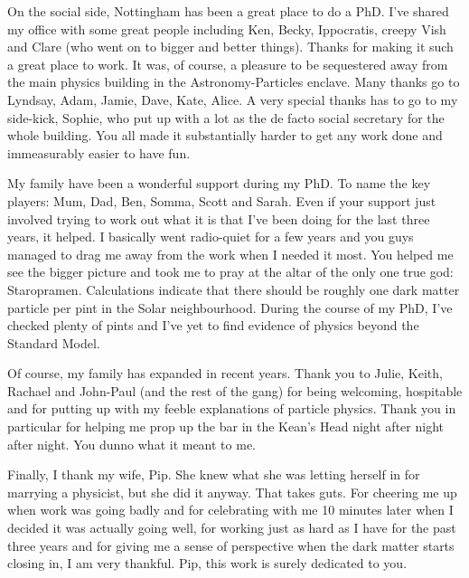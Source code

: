 On the social side, Nottingham has been a great place to do a PhD. I've shared my office with some great people including Ken, Becky, Ippocratis, creepy Vish and Clare (who went on to bigger and better things). Thanks for making it such a great place to work. It was, of course, a pleasure to be sequestered away from the main physics building in the Astronomy-Particles enclave. Many thanks go to Lyndsay, Adam, Jamie, Dave, Kate, Alice. A very special thanks has to go to my side-kick, Sophie, who put up with a lot as the de facto social secretary for the whole building.  You all made it substantially harder to get any work done and immeasurably easier to have fun. 

My family have been a wonderful support during my PhD. To name the key players: Mum, Dad, Ben, Somma, Scott and Sarah. Even if your support just involved trying to work out what it is that I've been doing for the last three years, it helped. I basically went radio-quiet for a few years and you guys managed to drag me away from the work when I needed it most. You helped me see the bigger picture and took me to pray at the altar of the only one true god: Staropramen. Calculations indicate that there should be roughly one dark matter particle per pint in the Solar neighbourhood. During the course of my PhD, I've checked plenty of pints and I've yet to find evidence of physics beyond the Standard Model.

Of course, my family has expanded in recent years. Thank you to Julie, Keith, Rachael and John-Paul (and the rest of the gang) for being welcoming, hospitable and for putting up with my feeble explanations of particle physics. Thank you in particular for helping me prop up the bar in the Kean's Head night after night after night. You dunno what it meant to me.

Finally, I thank my wife, Pip. She knew what she was letting herself in for marrying a physicist, but she did it anyway. That takes guts. For cheering me up when work was going badly and for celebrating with me 10 minutes later when I decided it was actually going well, for working just as hard as I have for the past three years and for giving me a sense of perspective when the dark matter starts closing in, I am very thankful. Pip, this work is surely dedicated to you.





